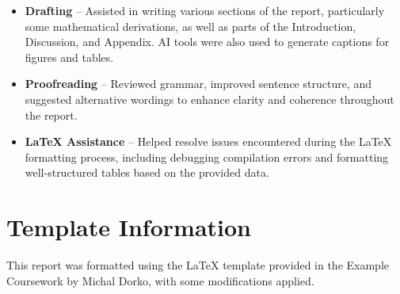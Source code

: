 \documentclass[11pt]{article}
\begin{document}
\begin{itemize}
    \item \textbf{Drafting} – Assisted in writing various sections of the report, particularly some mathematical derivations, as well as parts of the Introduction, Discussion, and Appendix. AI tools were also used to generate captions for figures and tables.

    \item \textbf{Proofreading} – Reviewed grammar, improved sentence structure, and suggested alternative wordings to enhance clarity and coherence throughout the report.

    \item \textbf{LaTeX Assistance} – Helped resolve issues encountered during the LaTeX formatting process, including debugging compilation errors and formatting well-structured tables based on the provided data.
\end{itemize}



\section{Template Information}
This report was formatted using the LaTeX template provided in the Example Coursework by Michal Dorko, with some modifications applied.


\newpage
\printbibliography
\end{document}
